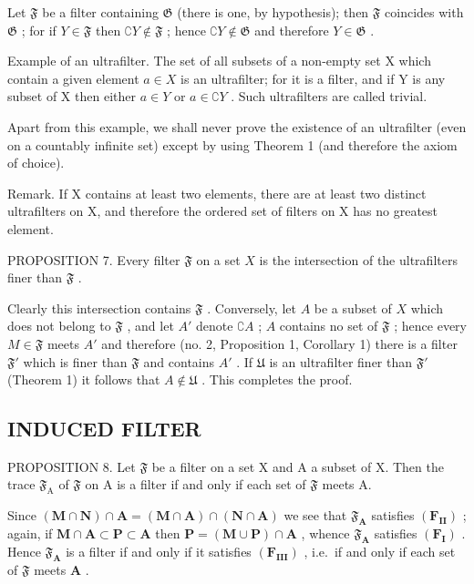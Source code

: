 Let \(\mathfrak{F}\) be a filter containing \(\mathfrak{G}\) (there is one, by hypothesis); then \(\mathfrak{F}\) coincides with \(\mathfrak{G}\) ; for if \(Y \in \mathfrak{F}\) then \(\complement Y \notin \mathfrak{F}\) ; hence \(\complement Y \notin \mathfrak{G}\) and therefore \(Y \in \mathfrak{G}\) .

Example of an ultrafilter. The set of all subsets of a non-empty set X which contain a given element \(a \in X\) is an ultrafilter; for it is a filter, and if Y is any subset of X then either \(a \in Y\) or \(a \in \complement Y\) . Such ultrafilters are called trivial.

Apart from this example, we shall never prove the existence of an ultrafilter (even on a countably infinite set) except by using Theorem 1 (and therefore the axiom of choice).

Remark. If X contains at least two elements, there are at least two distinct ultrafilters on X, and therefore the ordered set of filters on X has no greatest element.

PROPOSITION 7. Every filter \(\mathfrak{F}\) on a set \(X\) is the intersection of the ultrafilters finer than \(\mathfrak{F}\) .

Clearly this intersection contains \(\mathfrak{F}\) . Conversely, let \(A\) be a subset of \(X\) which does not belong to \(\mathfrak{F}\) , and let \(A'\) denote \(\complement A\) ; \(A\) contains no set of \(\mathfrak{F}\) ; hence every \(M \in \mathfrak{F}\) meets \(A'\) and therefore (no. 2, Proposition 1, Corollary 1) there is a filter \(\mathfrak{F}'\) which is finer than \(\mathfrak{F}\) and contains \(A'\) . If \(\mathfrak{U}\) is an ultrafilter finer than \(\mathfrak{F}'\) (Theorem 1) it follows that \(A \notin \mathfrak{U}\) . This completes the proof.

\subsection{INDUCED FILTER}

PROPOSITION 8. Let \(\mathfrak{F}\) be a filter on a set X and A a subset of X. Then the trace \(\mathfrak{F}_{\mathrm{A}}\) of \(\mathfrak{F}\) on A is a filter if and only if each set of \(\mathfrak{F}\) meets A.

Since \((\mathbf{M} \cap \mathbf{N}) \cap \mathbf{A} = (\mathbf{M} \cap \mathbf{A}) \cap (\mathbf{N} \cap \mathbf{A})\) we see that \(\mathfrak{F}_{\mathbf{A}}\) satisfies \((\mathbf{F}_{\mathbf{II}})\) ; again, if \(\mathbf{M} \cap \mathbf{A} \subset \mathbf{P} \subset \mathbf{A}\) then \(\mathbf{P} = (\mathbf{M} \cup \mathbf{P}) \cap \mathbf{A}\) , whence \(\mathfrak{F}_{\mathbf{A}}\) satisfies \((\mathbf{F}_{\mathbf{I}})\) . Hence \(\mathfrak{F}_{\mathbf{A}}\) is a filter if and only if it satisfies \((\mathbf{F}_{\mathbf{III}})\) , i.e.~if and only if each set of \(\mathfrak{F}\) meets \(\mathbf{A}\) .

